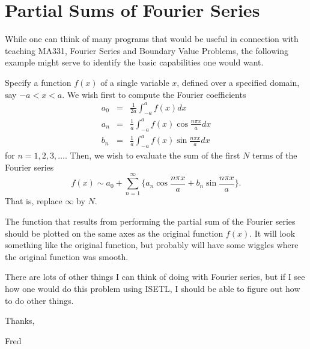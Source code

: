 \pagestyle{empty}

\section*{Partial Sums of Fourier Series}
While one can think of many programs that would be useful
in connection with teaching MA331, Fourier Series and
Boundary Value Problems, the following example might serve
to identify the basic capabilities one would want.

Specify a function $f(x)$ of a single variable $x$, defined over
a specified domain, say $-a < x < a$.  We wish first to compute
the Fourier coefficients 
\begin{eqnarray*} 
a_{0} & = & \frac{1}{2a} \int_{-a}^{a} f(x) dx \\
a_{n} & = & \frac{1}{a} \int_{-a}^{a} f(x) \cos{\frac{n\pi x}{a}} dx \\
b_{n} & = & \frac{1}{a} \int_{-a}^{a} f(x) \sin{\frac{n\pi x}{a}} dx 
\end{eqnarray*}
for $n=1,2,3,\ldots$.  Then, we wish to evaluate the sum of the
first $N$ terms of the Fourier series
$$f(x) \sim a_{0} + \sum_{n=1}^{\infty} \{
a_{n} \cos{\frac{n\pi x}{a}} + b_{n} \sin{\frac{n\pi x}{a}}
\}.$$  That is, replace $\infty$ by $N$.

The function that results from performing the partial sum of the
Fourier series should be plotted on the same axes as the
original function $f(x)$.  It will look something like the
original function, but probably will have some wiggles where the
original function was smooth.

There are lots of other things I can think of doing with Fourier
series, but if I see how one would do this problem using ISETL,
I should be able to figure out how to do other things.

Thanks,

Fred



